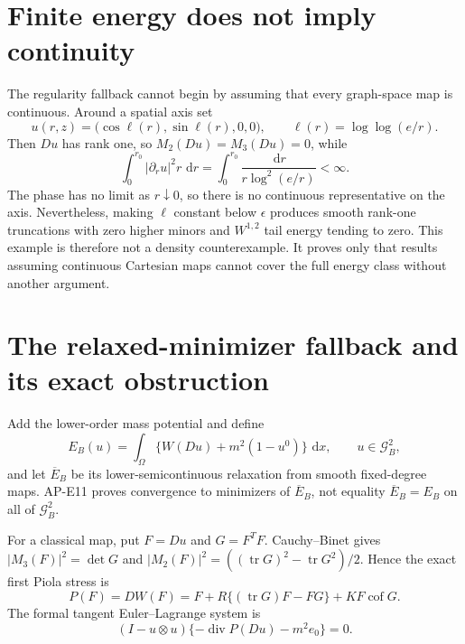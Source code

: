 \documentclass[11pt]{article}
\newcommand{\dd}{\,\mathrm d}
\newcommand{\tr}{\operatorname{tr}}
\newcommand{\cof}{\operatorname{cof}}
\newcommand{\GG}{\mathcal G}
\begin{document}
\section{Finite energy does not imply continuity}

The regularity fallback cannot begin by assuming that every graph-space map
is continuous.  Around a spatial axis set
\begin{equation}
 u(r,z)=\bigl(\cos\ell(r),\sin\ell(r),0,0\bigr),\qquad
 \ell(r)=\log\log(e/r).
 \label{eq:rank-one-discontinuous}
\end{equation}
Then $Du$ has rank one, so $M_2(Du)=M_3(Du)=0$, while
\begin{equation}
 \int_0^{r_0}|\partial_ru|^2r\,\dd r
 =\int_0^{r_0}\frac{\dd r}{r\log^2(e/r)}<\infty.
 \label{eq:rank-one-energy}
\end{equation}
The phase has no limit as $r\downarrow0$, so there is no continuous
representative on the axis.  Nevertheless, making $\ell$ constant below
$\epsilon$ produces smooth rank-one truncations with zero higher minors and
$W^{1,2}$ tail energy tending to zero.  This example is therefore not a
density counterexample.  It proves only that results assuming continuous
Cartesian maps cannot cover the full energy class without another argument.

\section{The relaxed-minimizer fallback and its exact obstruction}

Add the lower-order mass potential and define
\begin{equation}
 E_B(u)=\int_\Omega\{W(Du)+m^2(1-u^0)\}\,\dd x,\qquad u\in\GG_B^2,
 \label{eq:energy}
\end{equation}
and let $\overline E_B$ be its lower-semicontinuous relaxation from smooth
fixed-degree maps.  AP-E11 proves convergence to minimizers of
$\overline E_B$, not equality $\overline E_B=E_B$ on all of $\GG_B^2$.

For a classical map, put $F=Du$ and $G=F^TF$.  Cauchy--Binet gives
$|M_3(F)|^2=\det G$ and
$|M_2(F)|^2=((\tr G)^2-\tr G^2)/2$.  Hence the exact first Piola stress is
\begin{equation}
 P(F)=DW(F)=F+R\{(\tr G)F-FG\}+KF\cof G.
 \label{eq:stress}
\end{equation}
The formal tangent Euler--Lagrange system is
\begin{equation}
 (I-u\otimes u)\{-\operatorname{div}P(Du)-m^2e_0\}=0.
 \label{eq:projected-el}
\end{equation}
\end{document}
